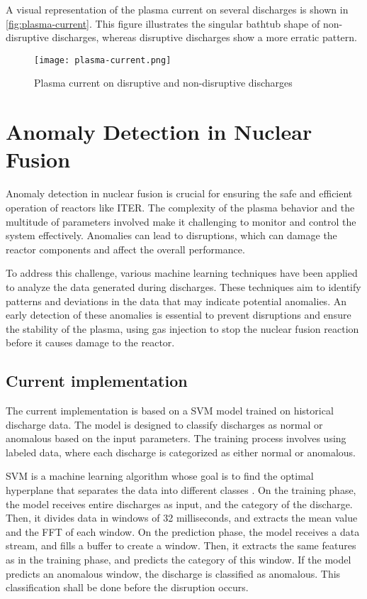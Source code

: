 A visual representation of the plasma current on several discharges is shown in \autoref{fig:plasma-current}. This figure illustrates the singular bathtub shape of non-disruptive discharges, whereas disruptive discharges show a more erratic pattern.

\begin{figure}[H]
    \centering
    \texttt{[image: plasma-current.png]}
    \caption{Plasma current on disruptive and non-disruptive discharges}
    \label{fig:plasma-current}
\end{figure}

\section{Anomaly Detection in Nuclear Fusion}

Anomaly detection in nuclear fusion is crucial for ensuring the safe and efficient operation of reactors like \ac{ITER}. The complexity of the plasma behavior and the multitude of parameters involved make it challenging to monitor and control the system effectively. Anomalies can lead to disruptions, which can damage the reactor components and affect the overall performance.

To address this challenge, various machine learning techniques have been applied to analyze the data generated during discharges. These techniques aim to identify patterns and deviations in the data that may indicate potential anomalies. An early detection of these anomalies is essential to prevent disruptions and ensure the stability of the plasma, using gas injection to stop the nuclear fusion reaction before it causes damage to the reactor.

\subsection{Current implementation}

The current implementation is based on a \ac{SVM} model trained on historical discharge data. The model is designed to classify discharges as normal or anomalous based on the input parameters. The training process involves using labeled data, where each discharge is categorized as either normal or anomalous.

\ac{SVM} is a machine learning algorithm whose goal is to find the optimal hyperplane that separates the data into different classes \autocite{6524743}. On the training phase, the model receives entire discharges as input, and the category of the discharge. Then, it divides data in windows of 32 milliseconds, and extracts the mean value and the \ac{FFT} of each window. On the prediction phase, the model receives a data stream, and fills a buffer to create a window. Then, it extracts the same features as in the training phase, and predicts the category of this window. If the model predicts an anomalous window, the discharge is classified as anomalous. This classification shall be done before the disruption occurs.

